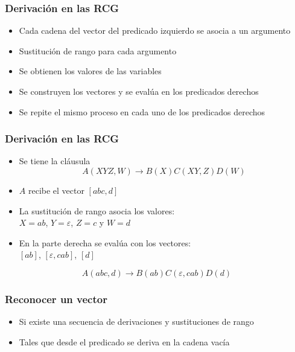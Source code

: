 \documentclass{beamer}
\begin{document}
\begin{frame}
    \frametitle{Derivación en las RCG}
    
    \begin{itemize}
        \item  Cada cadena del vector del predicado izquierdo se asocia a un argumento
              \pause
        \item Sustitución de rango para cada argumento
              \pause
        \item Se obtienen los valores de las variables
              \pause      
        \item Se construyen los vectores y se evalúa en los predicados derechos
              \pause      
        \item Se repite el mismo proceso en cada uno de los predicados derechos
    \end{itemize}
\end{frame}

\begin{frame}
    \frametitle{Derivación en las RCG}
    
    \begin{itemize}
        \item Se tiene la cláusula $$A(XYZ,W)\to B(X)C(XY,Z)D(W)$$
              \pause
        \item $A$ recibe el vector $[abc,d]$
              \pause
        \item La sustitución de rango asocia los valores:\\
              $X=ab$, $Y=\varepsilon$, $Z=c$ y $W=d$
              \pause
        \item En la parte derecha se evalúa con los vectores:\\
              $[ab]$, $[\varepsilon, cab]$, $[d]$
              \pause
    \end{itemize}
    
    $$A(abc,d)\to B(ab)C(\varepsilon,cab)D(d)$$
    
    
\end{frame}

\begin{frame}
    \frametitle{Reconocer un vector}
    
    \begin{itemize}
        \item Si existe una secuencia de derivaciones y sustituciones de rango
              \pause
        \item Tales que desde el predicado se deriva en la cadena vacía
    \end{itemize}
\end{frame}
\end{document}
